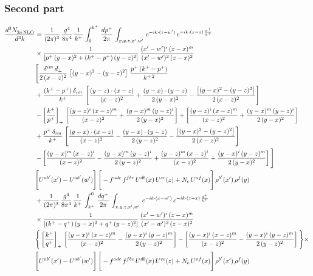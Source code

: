 \documentclass[9pt]{article}
\numberwithin{equation}{section}
\begin{document}
\subsubsection*{Second part}
\begin{align}
    \frac{d^{3}N_{2a\,\rm NLO}^{\rm}}{d^{3}k}  & =  \frac{1}{(2\pi)^{3}}\, \frac{g^{4}}{8\pi^{4}}\,\frac{1}{k^{+}}\,\int_{0}^{k^{+}}\, \frac{dp^{+}}{2\pi}\,\int_{x,y,z,x',w'}\, e^{-ik\cdot(z-w')}\,e^{-ik\cdot (x-z)\,\frac{p^{+}}{k^{+}}}\notag \\ & \times\frac{1}{\left[p^{+}\,(y-x)^{2}+(k^{+}-p^{+})\,(y-z)^{2}\right]}\, \frac{(x'-w')^{i}\,(z-x)^{m}}{(x'-w')^{2}\,(z-x)^{2}} \notag \\ & \Bigg[\frac{\delta^{im}\,d_{\perp}}{2\,(x-z)^{2}}\,\left[(y-x)^{2}-(y-z)^{2}\right]\,\frac{p^{+}\,(k^{+}-p^{+})}{k^{+\,2}}\notag \\ & +\frac{(k^{+}-p^{+})\,\delta_{im}}{k^{+}}\,\left[\frac{(y-z)\cdot (x-z)}{(x-z)^{2}}+\frac{(y-x)\cdot (y-z)}{2\,(y-x)^{2}}-\frac{\left[(y-x)^{2}-(y-z)^{2}\right]}{2\,(x-z)^{2}}\right]\notag \\ & -\left[\frac{k^{+}}{p^{+}}\right]_{+}\,\left[\frac{(y-z)^{i}\,(x-z)^{m}}{(x-z)^{2}}+\frac{(y-x)^{m}\,(y-z)^{i}}{2\,(y-x)^{2}}\right]+ \left[\frac{(y-z)^{i}\,(x-z)^{m}}{(x-z)^{2}}+\frac{(y-x)^{m}\,(y-z)^{i}}{2\,(y-x)^{2}}\right]\notag \\ & +\frac{p^{+}\,\delta_{im}}{k^{+}}\,\left[\frac{(y-x)\cdot (x-z)}{(x-z)^{2}}-\frac{(y-x)\cdot (y-z)}{2\,(y-z)^{2}}-\frac{\left[(y-x)^{2}-(y-z)^{2}\right]}{2\,(x-z)^{2}}\right]\notag \\ &-\left[\frac{(y-x)^{m}\,(x-z)^{i}}{(x-z)^{2}}-\frac{(y-x)^{m}\,(y-z)^{i}}{2\,(y-z)^{2}}+\frac{(y-z)^{m}\,(x-z)^{i}}{(x-z)^{2}}+\frac{(y-x)^{i}\,(y-z)^{m}}{2\,(y-x)^{2}}\right]\Bigg] \notag \\ & \Bigg[U^{ab'}(x')-U^{ab'}(w')\Bigg]\,\Bigg[-f^{adc}\,f^{fbe}\,U^{db}(x)\,U^{ce}(z)+N_{c}\,U^{af}(x)\Bigg]\,\rho^{b'}(x')\,\rho^{f}(y)\notag \\ & + \frac{1}{(2\pi)^{3}}\,\frac{g^{4}}{8\pi^{4}}\,\frac{1}{k^{+}}\, \int^{0}_{k^{+}}\, \frac{dq^{+}}{2\pi} \,  \int_{x,y,z,x',w'}\,e^{-ik\cdot(x-w')}\,e^{-ik\cdot (z-x)\,\frac{q^{+}}{k^{+}}}\notag \\ & \times\frac{1}{\left[(k^{+}-q^{+})\,(y-x)^{2}+q^{+}\,(y-z)^{2}\right]}\, \frac{(x'-w')^{i}\,(z-x)^{m}}{(x'-w')^{2}\,(z-x)^{2}} \notag \\ &\Bigg\{\left[\frac{k^{+}}{q^{+}}\right]_{+}\,\left[\frac{(y-x)^{i}\,(x-z)^{m}}{(x-z)^{2}}-\frac{(y-x)^{i}\,(y-z)^{m}}{2\,(y-z)^{2}}\right] -\left[\frac{(y-x)^{i}\,(x-z)^{m}}{(x-z)^{2}}-\frac{(y-x)^{i}\,(y-z)^{m}}{2\,(y-z)^{2}}\right]\Bigg\}\times\,\notag \\ & \Bigg[U^{ab'}(x')-U^{ab'}(w')\Bigg]\,\Bigg[-f^{adc}\,f^{fbe}\,U^{db}(x)\,U^{ce}(z)+N_{c}\,U^{af}(x)\Bigg]\,\rho^{b'}(x')\,\rho^{f}(y)
\end{align} 
\end{document}
